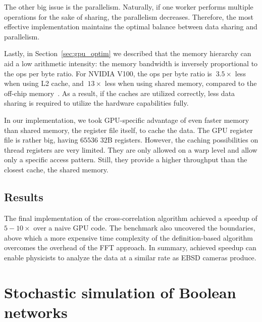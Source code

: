 The other big issue is the parallelism. Naturally, if one worker performs multiple operations for the sake of sharing, the parallelism decreases. Therefore, the most effective implementation maintains the optimal balance between data sharing and parallelism.

Lastly, in Section~\ref{sec:gpu_optim} we described that the memory hierarchy can aid a low arithmetic intensity: the memory bandwidth is inversely proportional to the ops per byte ratio. For NVIDIA V100, the ops per byte ratio is $~3.5\times$ less when using L2 cache, and $~13\times$ less when using shared memory, compared to the off-chip memory~\cite{jia2018dissecting}. As a result, if the caches are utilized correctly, less data sharing is required to utilize the hardware capabilities fully.

In our implementation, we took GPU-specific advantage of even faster memory than shared memory, the register file itself, to cache the data. The GPU register file is rather big, having $65536$ $32$B registers. However, the caching possibilities on thread registers are very limited. They are only allowed on a warp level and allow only a specific access pattern. Still, they provide a higher throughput than the closest cache, the shared memory.

\subsection{Results}

The final implementation of the cross-correlation algorithm achieved a speedup of $5-10\times$ over a naive GPU code. The benchmark also uncovered the boundaries, above which a more expensive time complexity of the definition-based algorithm overcomes the overhead of the FFT approach. In summary, achieved speedup can enable physicists to analyze the data at a similar rate as EBSD cameras produce.


\section{Stochastic simulation of Boolean networks}




